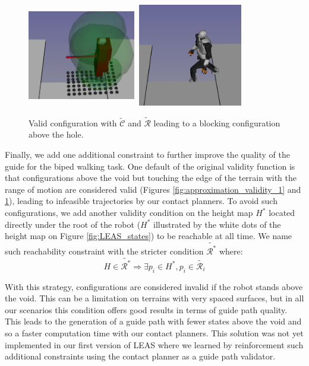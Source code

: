 \begin{figure}
    \centering
    \includegraphics[width=0.42\textwidth,height=4.5cm]{Figures/Chapter_LEAS/hole_scenario_above_void_p1.png}
    \includegraphics[width=0.42\textwidth,height=4.5cm]{Figures/Chapter_LEAS/hole_scenario_above_void.png}
    \caption{Valid configuration with $\tilde{\mathcal{C}}$ and $\tilde{\mathcal{R}}$ leading to a blocking configuration above the hole.}
    \label{fig:hole_scenario_above_void}
\end{figure}

Finally, we add one additional constraint to further improve the quality of the guide for the biped walking task. 
One default of the original validity function is that configurations above the void but touching the edge of the terrain with the range of motion are considered valid (Figures \ref{fig:approximation_validity_1} and \ref{fig:hole_scenario_above_void}), leading to infeasible trajectories by our contact planners.
To avoid such configurations, we add another validity condition on the height map $H^*$ located directly under the root of the robot ($H^*$ illustrated by the white dots of the height map on Figure \ref{fig:LEAS_states}) to be reachable at all time. 
We name such reachability constraint with the stricter condition $\tilde{\mathcal{R}^*}$ where:
\begin{equation}
    H \in \tilde{\mathcal{R}^*} \Rightarrow \exists p_i \in H^*, p_i \in \tilde{\mathcal{R}_i}
\end{equation}

With this strategy, configurations are considered invalid if the robot stands above the void. 
This can be a limitation on terrains with very spaced surfaces, but in all our scenarios this condition offers good results in terms of guide path quality.
This leads to the generation of a guide path with fewer states above the void and so a faster computation time with our contact planners.
This solution was not yet implemented in our first version of LEAS \cite{LEAS} where we learned by reinforcement such additional constraints using the contact planner as a guide path validator.

